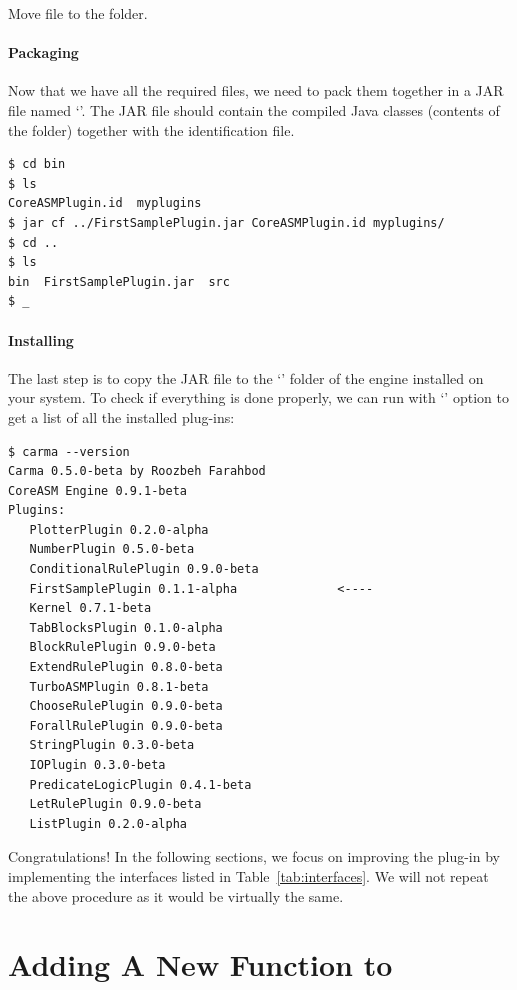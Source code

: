 \documentclass{article}
\begin{document}
Move  file to the  folder.

\paragraph{Packaging} Now that we have all the required files, we need to pack them together in 
a JAR file named `'. The JAR file should contain the compiled Java 
classes (contents of the  folder)
together with the identification file.    

\begin{shell}
\begin{verbatim}
$ cd bin
$ ls
CoreASMPlugin.id  myplugins
$ jar cf ../FirstSamplePlugin.jar CoreASMPlugin.id myplugins/
$ cd ..
$ ls
bin  FirstSamplePlugin.jar  src
$ _
\end{verbatim}
\end{shell}

\paragraph{Installing} The last step is to copy the JAR file to the `' folder of 
the \CoreASM engine installed on your system. To check if everything is done properly, we can 
run \Carma with `' option to get a list of all the installed plug-ins:

\begin{shell}
\begin{verbatim}
$ carma --version
Carma 0.5.0-beta by Roozbeh Farahbod
CoreASM Engine 0.9.1-beta
Plugins: 
   PlotterPlugin 0.2.0-alpha
   NumberPlugin 0.5.0-beta
   ConditionalRulePlugin 0.9.0-beta
   FirstSamplePlugin 0.1.1-alpha              <----
   Kernel 0.7.1-beta
   TabBlocksPlugin 0.1.0-alpha
   BlockRulePlugin 0.9.0-beta
   ExtendRulePlugin 0.8.0-beta
   TurboASMPlugin 0.8.1-beta
   ChooseRulePlugin 0.9.0-beta
   ForallRulePlugin 0.9.0-beta
   StringPlugin 0.3.0-beta
   IOPlugin 0.3.0-beta
   PredicateLogicPlugin 0.4.1-beta
   LetRulePlugin 0.9.0-beta
   ListPlugin 0.2.0-alpha
\end{verbatim}
\end{shell}

Congratulations! In the following sections, we focus on improving the plug-in by implementing the interfaces listed in Table~\ref{tab:interfaces}.
We will not repeat the above procedure as it would be virtually the same.  

\section{Adding A New Function to \CoreASM}
\label{sec:newfunctions}
\end{document}
